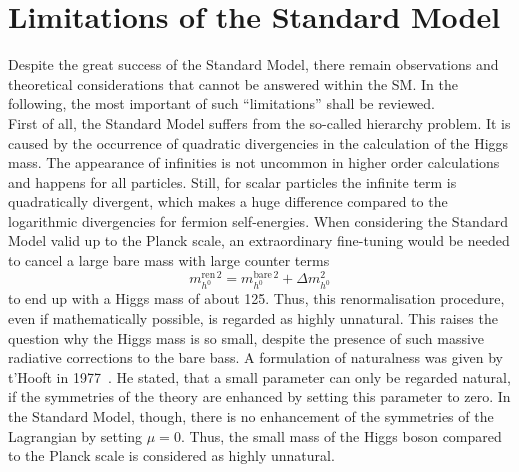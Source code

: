 \section{Limitations of the Standard Model}
\label{sec:Limitations}
Despite the great success of the Standard Model, there remain observations and theoretical considerations that cannot be answered within the SM.
In the following, the most important of such ``limitations'' shall be reviewed.\\

First of all, the Standard Model suffers from the so-called hierarchy problem.
It is caused by the occurrence of quadratic divergencies in the calculation of the Higgs mass.
The appearance of infinities is not uncommon in higher order calculations and happens for all particles. 
Still, for scalar particles the infinite term is quadratically divergent, which makes a huge difference compared to the logarithmic divergencies for fermion self-energies. 
When considering the Standard Model valid up to the Planck scale, an extraordinary fine-tuning would be needed to cancel a large bare mass with large counter terms 
\begin{equation}
 m^{\text{ren}\,2}_{h^0} = m_{h^0}^{\text{bare}\,2} + \Delta m^2_{h^0}
\end{equation}
to end up with a Higgs mass of about 125\gev.
Thus, this renormalisation procedure, even if mathematically possible, is regarded as highly unnatural.
This raises the question why the Higgs mass is so small, despite the presence of such massive radiative corrections to the bare bass.
A formulation of naturalness was given by t'Hooft in 1977~\cite{bib:Naturalness_tHooft}. 
He stated, that a small parameter can only be regarded natural, if the symmetries of the theory are enhanced by setting this parameter to zero.
In the Standard Model, though, there is no enhancement of the symmetries of the Lagrangian by setting $\mu=0$.
Thus, the small mass of the Higgs boson compared to the Planck scale is considered as highly unnatural.




